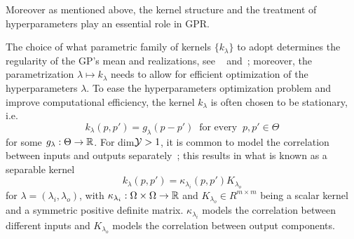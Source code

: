 Moreover as mentioned above, the kernel structure and the treatment of hyperparameters play an essential role in GPR.

The choice of what parametric family of kernels $\{ k_\lambda\}$ to adopt determines the regularity of the GP's mean and realizations, see ~\cite{Kanagawa2018} and~\cite[chap. 4]{ChristmannSteinwart2008}; moreover, the parametrization $\lambda \mapsto k_\lambda$ needs to allow for efficient optimization of the hyperparameters $\lambda$. \newline
To ease the hyperparameters optimization problem and improve computational efficiency, the kernel $k_\lambda$ is often chosen to be stationary, i.e. 
\[
k_\lambda(p, p') = g_\lambda(p - p') \ \text{ for every } \ p, p' \in \Theta
\]
for some $g_\lambda:\Theta \rightarrow \mathbb{R}$.
For dim$\mathcal Y > 1$, it is common to model the correlation between inputs and outputs separately~\cite{AlvarezRosascoLawrence2012}; this results in what is known as a separable kernel 
\begin{equation}\label{eq:separable-kernel}
    k_\lambda(p, p') = \kappa_{\lambda_i}(p, p') K_{\lambda_o}
\end{equation}
for $\lambda = (\lambda_i, \lambda_o)$, with $\kappa_{\lambda_i}: \Omega \times \Omega \rightarrow \mathbb{R}$ and $K_{\lambda_o} \in R^{m\times m}$ being a scalar kernel and a symmetric positive definite matrix.
$\kappa_{\lambda_i}$ models the correlation between different inputs and $K_{\lambda_o}$ models the correlation between output components.

